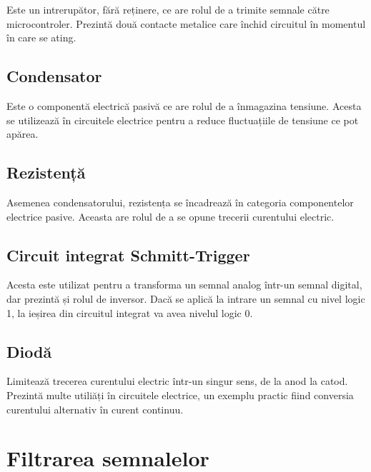 	Este un intrerupător, fără reținere, ce are rolul de a trimite semnale către microcontroler. Prezintă două contacte metalice care închid circuitul în momentul în care se ating. 

\subsection{Condensator}

	Este o componentă electrică pasivă ce are rolul de a înmagazina tensiune. Acesta se utilizează în circuitele electrice pentru a reduce fluctuațiile de tensiune ce pot apărea.

\subsection{Rezistență}

	Asemenea condensatorului, rezistența se încadrează în categoria componentelor electrice pasive. Aceasta are rolul de a se opune trecerii curentului electric. 

\subsection{Circuit integrat Schmitt-Trigger}

	Acesta este utilizat pentru a transforma un semnal analog într-un semnal digital, dar prezintă și rolul de inversor. Dacă se aplică la intrare un semnal cu nivel logic 1, la ieșirea din circuitul integrat va avea nivelul logic 0.

\subsection{Diodă}

	Limitează trecerea curentului electric într-un singur sens, de la anod la catod. Prezintă multe utiliăți în circuitele electrice, un exemplu practic fiind conversia curentului alternativ în curent continuu. 

\section{Filtrarea semnalelor}

